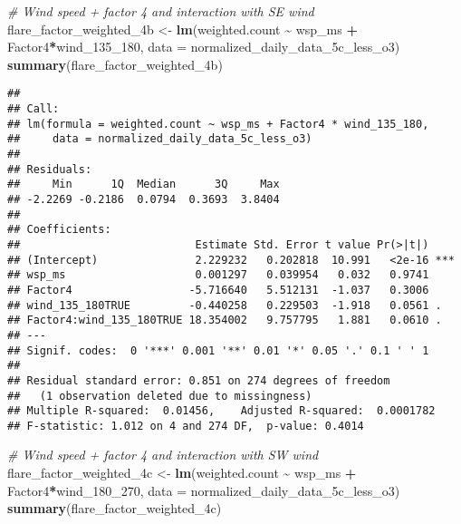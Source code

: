 \documentclass[
]{article}
\newenvironment{Shaded}{\begin{snugshade}}{\end{snugshade}}
\newcommand{\AttributeTok}[1]{\textcolor[rgb]{0.13,0.29,0.53}{#1}}
\newcommand{\CommentTok}[1]{\textcolor[rgb]{0.56,0.35,0.01}{\textit{#1}}}
\newcommand{\FunctionTok}[1]{\textcolor[rgb]{0.13,0.29,0.53}{\textbf{#1}}}
\newcommand{\NormalTok}[1]{#1}
\newcommand{\OtherTok}[1]{\textcolor[rgb]{0.56,0.35,0.01}{#1}}
\newcommand{\SpecialCharTok}[1]{\textcolor[rgb]{0.81,0.36,0.00}{\textbf{#1}}}
\begin{document}
\begin{Shaded}
\begin{Highlighting}[]
\CommentTok{\# Wind speed + factor 4 and interaction with SE wind}
\NormalTok{flare\_factor\_weighted\_4b }\OtherTok{\textless{}{-}} \FunctionTok{lm}\NormalTok{(weighted.count }\SpecialCharTok{\textasciitilde{}}\NormalTok{ wsp\_ms }\SpecialCharTok{+}\NormalTok{ Factor4}\SpecialCharTok{*}\NormalTok{wind\_135\_180, }
                               \AttributeTok{data =}\NormalTok{ normalized\_daily\_data\_5c\_less\_o3)}
\FunctionTok{summary}\NormalTok{(flare\_factor\_weighted\_4b)}
\end{Highlighting}
\end{Shaded}

\begin{verbatim}
## 
## Call:
## lm(formula = weighted.count ~ wsp_ms + Factor4 * wind_135_180, 
##     data = normalized_daily_data_5c_less_o3)
## 
## Residuals:
##     Min      1Q  Median      3Q     Max 
## -2.2269 -0.2186  0.0794  0.3693  3.8404 
## 
## Coefficients:
##                           Estimate Std. Error t value Pr(>|t|)    
## (Intercept)               2.229232   0.202818  10.991   <2e-16 ***
## wsp_ms                    0.001297   0.039954   0.032   0.9741    
## Factor4                  -5.716640   5.512131  -1.037   0.3006    
## wind_135_180TRUE         -0.440258   0.229503  -1.918   0.0561 .  
## Factor4:wind_135_180TRUE 18.354002   9.757795   1.881   0.0610 .  
## ---
## Signif. codes:  0 '***' 0.001 '**' 0.01 '*' 0.05 '.' 0.1 ' ' 1
## 
## Residual standard error: 0.851 on 274 degrees of freedom
##   (1 observation deleted due to missingness)
## Multiple R-squared:  0.01456,    Adjusted R-squared:  0.0001782 
## F-statistic: 1.012 on 4 and 274 DF,  p-value: 0.4014
\end{verbatim}

\begin{Shaded}
\begin{Highlighting}[]
\CommentTok{\# Wind speed + factor 4 and interaction with SW wind}
\NormalTok{flare\_factor\_weighted\_4c }\OtherTok{\textless{}{-}} \FunctionTok{lm}\NormalTok{(weighted.count }\SpecialCharTok{\textasciitilde{}}\NormalTok{ wsp\_ms }\SpecialCharTok{+}\NormalTok{ Factor4}\SpecialCharTok{*}\NormalTok{wind\_180\_270, }
                               \AttributeTok{data =}\NormalTok{ normalized\_daily\_data\_5c\_less\_o3)}
\FunctionTok{summary}\NormalTok{(flare\_factor\_weighted\_4c)}
\end{Highlighting}
\end{Shaded}
\end{document}
